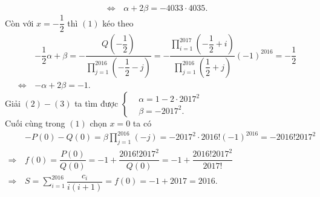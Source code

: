 \begin{bt}
{\begin{align*}
   \Leftrightarrow \, &\alpha+2\beta=-4033\cdot 4035. \tag{$2$}
  \end{align*}
  Còn với $x=-\dfrac{1}{2}$ thì $(1)$ kéo theo
  \begin{align*}
   &-\dfrac{1}{2}\alpha + \beta =-\dfrac{Q\left(-\dfrac{1}{2}\right)}{\displaystyle\prod\limits_{j=1}^{2016}\left(-\dfrac{1}{2}-j\right)} = -\dfrac{\displaystyle\prod\limits_{i=1}^{2017}\left(-\dfrac{1}{2}+i\right)}{\displaystyle\prod\limits_{j=1}^{2016}\left(\dfrac{1}{2}+j\right)}(-1)^{2016} = -\dfrac{1}{2}\\
   \Leftrightarrow \, &-\alpha+2\beta=-1. \tag{$3$}
  \end{align*}
  Giải $(2)-(3)$ ta tìm được $\left\{\begin{aligned}&\alpha=1-2\cdot2017^2 \\&\beta=-2017^2.\end{aligned}\right.$\\
  Cuối cùng trong $(1)$ chọn $x=0$ ta có
  \begin{align*}
   &-P(0)-Q(0)=\beta\prod\limits_{j=1}^{2016}(-j)=-2017^2\cdot 2016!(-1)^{2016}=-2016!2017^2\\
   \Rightarrow \,&f(0)=\dfrac{P(0)}{Q(0)}=-1+\dfrac{2016!2017^2}{Q(0)}=-1+\dfrac{2016!2017^2}{2017!}\\
   \Rightarrow \,&S=\sum\limits_{i=1}^{2016}\dfrac{c_i}{i(i+1)}=f(0)=-1+2017=2016.
  \end{align*}
  }
\end{bt}

